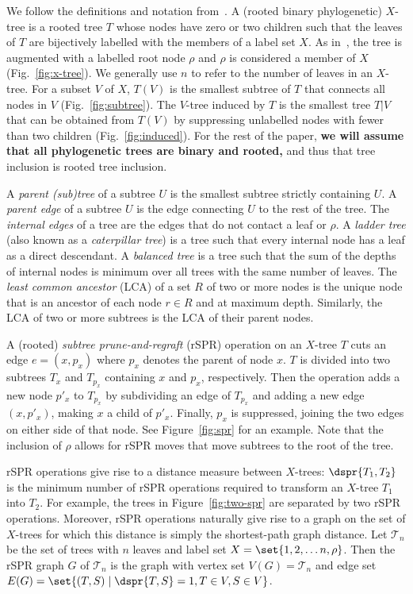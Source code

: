 \documentclass[11pt,onecolumn,conference]{IEEEtran}
\begin{document}
We follow the definitions and notation from~\cite{bordewich05,whidden2013hybridization, Whidden2015-yi}.
A (rooted binary phylogenetic) $X$-tree is a rooted tree $T$ whose nodes have zero or two children such that the leaves of $T$ are bijectively labelled with the members of a label set $X$.
As in~\cite{bordewich05,whidden2013hybridization,Whidden2015-yi}, the tree is augmented with a labelled root node $\rho$ and $\rho$ is considered a member of $X$ (Fig.~\ref{fig:x-tree}).
We generally use $n$ to refer to the number of leaves in an $X$-tree.
For a subset $V$ of $X$, $T(V)$ is the smallest subtree of $T$ that connects all nodes in $V$ (Fig.~\ref{fig:subtree}).
The $V$-tree induced by $T$ is the smallest tree $T|V$ that can be obtained from $T(V)$ by suppressing unlabelled nodes with fewer than two children (Fig.~\ref{fig:induced}).
For the rest of the paper, \textbf{we will assume that all phylogenetic trees are binary and rooted,} and thus that tree inclusion is rooted tree inclusion.

A \emph{parent (sub)tree} of a subtree $U$ is the smallest subtree strictly containing $U$.
A \emph{parent edge} of a subtree $U$ is the edge connecting $U$ to the rest of the tree.
The \emph{internal edges} of a tree are the edges that do not contact a leaf or $\rho$.
A \emph{ladder tree} (also known as a \emph{caterpillar tree}) is a tree such that every internal node has a leaf as a direct descendant.
A \emph{balanced tree} is a tree such that the sum of the depths of internal nodes is minimum over all trees with the same number of leaves.
The \emph{least common ancestor} (LCA) of a set $R$ of two or more nodes is the unique node that is an ancestor of each node $r \in R$ and at maximum depth.
Similarly, the LCA of two or more subtrees is the LCA of their parent nodes.

A (rooted) \emph{subtree prune-and-regraft} (rSPR) operation on an $X$-tree $T$ cuts an edge $e = (x, p_x)$ where $p_x$ denotes the parent of node $x$.
$T$ is divided into two subtrees $T_x$ and $T_{p_x}$ containing $x$ and $p_x$, respectively.
Then the operation adds a new node $p'_x$ to $T_{p_x}$ by subdividing an edge of $T_{p_x}$ and adding a new edge $(x, p'_x)$, making $x$ a child of $p'_x$.
Finally, $p_x$ is suppressed, joining the two edges on either side of that node.
See Figure~\ref{fig:spr} for an example.
Note that the inclusion of $\rho$ allows for rSPR moves that move subtrees to the root of the tree.

rSPR operations give rise to a distance measure between $X$-trees: $\dspr{T_1, T_2}$ is the minimum number of rSPR operations required to transform an $X$-tree $T_1$ into $T_2$.
For example, the trees in Figure~\ref{fig:two-spr} are separated by two rSPR operations.
Moreover, rSPR operations naturally give rise to a graph on the set of $X$-trees for which this distance is simply the shortest-path graph distance.
Let $\mathcal{T}_n$ be the set of trees with $n$ leaves and label set $X = \set{1, 2, \ldots n, \rho}$.
Then the rSPR graph $G$ of $\mathcal{T}_n$ is the graph with vertex set $V(G) = \mathcal{T}_n$ and edge set $E(G) = \set{(T,S) \mid \dspr{T,S} = 1, T \in V, S \in V}$.
\end{document}
